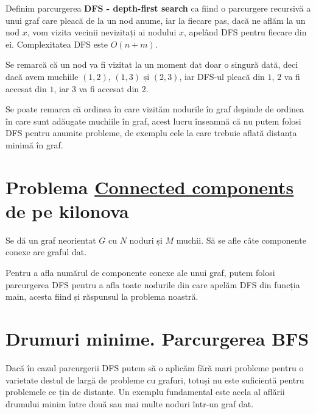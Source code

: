 \begin{definition}
    Definim parcurgerea \textbf{DFS - depth-first search} ca fiind o parcurgere recursivă a unui graf care pleacă de la un nod anume, iar la fiecare pas, dacă ne aflăm la un nod $x$, vom vizita vecinii nevizitați ai nodului $x$, apelând DFS pentru fiecare din ei. Complexitatea DFS este $O(n + m)$.
\end{definition}

\begin{observation}
    Se remarcă că un nod va fi vizitat la un moment dat doar o singură dată, deci dacă avem muchiile $(1, 2)$, $(1, 3)$ și $(2, 3)$, iar DFS-ul pleacă din $1$, $2$ va fi accesat din $1$, iar $3$ va fi accesat din $2$.
\end{observation}

\begin{observation}
    Se poate remarca că ordinea în care vizităm nodurile în graf depinde de ordinea în care sunt adăugate muchiile în graf, acest lucru înseamnă că nu putem folosi DFS pentru anumite probleme, de exemplu cele la care trebuie aflată distanța minimă în graf.
\end{observation}

\section{Problema \href{https://kilonova.ro/problems/2036}{Connected components} de pe kilonova}

Se dă un graf neorientat $G$ cu $N$ noduri și $M$ muchii. Să se afle câte componente conexe are graful dat.

Pentru a afla numărul de componente conexe ale unui graf, putem folosi parcurgerea DFS pentru a afla toate nodurile din care apelăm DFS din funcția main, acesta fiind și răspunsul la problema noastră. 


\section{Drumuri minime. Parcurgerea BFS}

Dacă în cazul parcurgerii DFS putem să o aplicăm fără mari probleme pentru o varietate destul de largă de probleme cu grafuri, totuși nu este suficientă pentru problemele ce țin de distanțe. Un exemplu fundamental este acela al aflării drumului minim între două sau mai multe noduri într-un graf dat.

